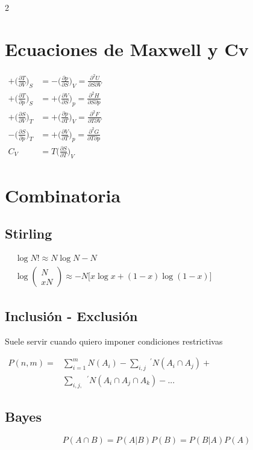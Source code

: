 \documentclass{article}
\begin{document}
\begin{multicols}{2}
\section*{Ecuaciones de Maxwell y Cv}
$
\begin{aligned}
    +\bigg(\frac{\partial T}{\partial V}\bigg)_S &= -\bigg(\frac{\partial p}{\partial S}\bigg)_V = \frac{\partial^2 U}{\partial S \partial V} \\
    +\bigg(\frac{\partial T}{\partial p}\bigg)_S &= +\bigg(\frac{\partial V}{\partial S}\bigg)_p = \frac{\partial^2 H}{\partial S \partial p} \\
    +\bigg(\frac{\partial S}{\partial V}\bigg)_T &= +\bigg(\frac{\partial p}{\partial T}\bigg)_V = \frac{\partial^2 F}{\partial T \partial V} \\
    -\bigg(\frac{\partial S}{\partial p}\bigg)_T &= +\bigg(\frac{\partial V}{\partial T}\bigg)_p = \frac{\partial^2 G}{\partial T \partial p} \\
    C_V &= T \bigg(\frac{\partial S}{\partial T}\bigg)_V
\end{aligned}
$

\section*{Combinatoria}
\subsection{Stirling}
$
\begin{aligned}
    &\log{N!} \approx N\log{N} - N \\
    &\log\begin{pmatrix} N \\ xN \end{pmatrix} \approx -N \bigg[x\log{x} + (1 - x)\log({1 - x})\bigg]
\end{aligned}
$

\subsection{Inclusión - Exclusión}
Suele servir cuando quiero imponer condiciones restrictivas

$
\begin{aligned}
    P(n, m) =& \sum_{i = 1}^{m}N(A_i) - \sum_{i, j}\;^{'} N(A_i \cap A_j) + \\
    &\sum_{i, j, }\;^{'} N(A_i \cap A_j \cap A_k) - ...
\end{aligned}
$

\subsection{Bayes}
\begin{equation*}
    P(A \cap B) = P(A | B)P(B) = P(B|A)P(A)
\end{equation*}


\end{multicols}
\end{document}
